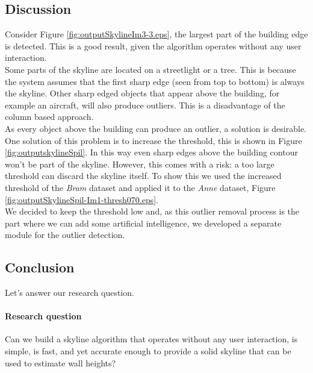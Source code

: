 \clearpage
{}
\clearpage
{}
\clearpage

\subsection{Discussion}  %
Consider Figure \ref{fig:outputSkylineIm3-3.eps}, the largest part of the
building edge is detected. This is a good result, given the algorithm
operates without any user interaction.\\

Some parts of the skyline are located on a streetlight or a tree. This is
because the system assumes that the first sharp edge (seen from top to bottom)
is always the skyline. Other sharp edged objects that appear above the
building, for example an aircraft, will also produce outliers. This is a
disadvantage of the column based approach.\\

As every object above the building can produce an outlier, a solution is
desirable. One solution of this problem is to increase the threshold, this is shown in Figure \ref{fig:outputskylineSpil}.
In this way even sharp edges above the building contour won't be part of the
skyline. However, this comes with a risk: a too large threshold can discard the
skyline itself. To show this we used the increased threshold of the \emph{Bram} dataset
and applied it to the \emph{Anne} dataset, Figure
\ref{fig:outputSkylineSpil-Im1-thresh070.eps}.\\

We decided to keep the threshold low and, as this outlier removal process is the
part where we can add some artificial intelligence, we developed a separate
module for the outlier detection.

\subsection{Conclusion}
Let's answer our research question.
\paragraph{Research question}
Can we build a skyline algorithm that operates without any user interaction, is
simple, is fast, and yet accurate enough to provide a solid skyline that can be
used to estimate wall heights?\\

